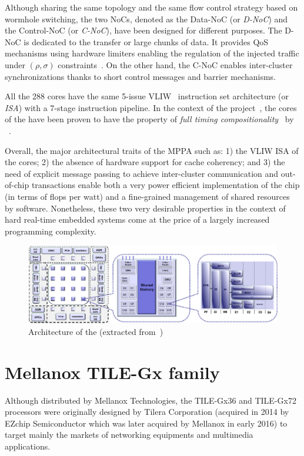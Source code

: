 \documentclass[main.tex]{subfiles}
\begin{document}
Although sharing the same topology and the same flow control strategy based on wormhole switching, the two NoCs, denoted as the Data-NoC (or \emph{D-NoC}) and the Control-NoC (or \emph{C-NoC}), have been designed for different purposes. The D-NoC is dedicated to the transfer or large chunks of data. It provides QoS mechanisms using hardware limiters enabling the regulation of the injected traffic under $(\rho , \sigma)$ constraints~\cite{deDinechin2014NoCArc}. On the other hand, the C-NoC enables inter-cluster synchronizations thanks to short control messages and barrier mechanisms. 

All the 288 cores have the same 5-issue VLIW~\cite{Fisher1983} instruction set architecture (or \emph{ISA}) with a 7-stage instruction pipeline. In the context of the \certainty project~\cite{Certainty}, the cores of the \mppalong have been proven to have the property of \emph{full timing compositionality}~\cite{Certainty:D33} by \absint~\cite{AbsInt}. 

Overall, the major architectural traits of the MPPA such as: 1) the VLIW ISA of the cores; 2) the absence of hardware support for cache coherency; and 3) the need of explicit message passing to achieve inter-cluster communication and out-of-chip transactions enable both a very power efficient implementation of the chip (in terms of flops per watt) and a fine-grained management of shared resources by software. Nonetheless, these two very desirable properties in the context of hard real-time embedded systems come at the price of a largely increased programming complexity.

\begin{figure}
    \centering
    \includegraphics[width=16cm]{imgs/png/all_MPPA_nested_overview.png}
    \caption{Architecture of the \mppalong (extracted from~\cite{kalray_slides_irit})}
    \label{fig_stateOfTheArt_mppa_overview}
\end{figure}


\section{Mellanox TILE-Gx family}
Although distributed by Mellanox Technologies, the TILE-Gx36 and TILE-Gx72 processors were originally designed by Tilera Corporation (acquired in 2014 by EZchip Semiconductor which was later acquired by Mellanox in early 2016) to target mainly the markets of networking equipments and multimedia applications.
\end{document}
